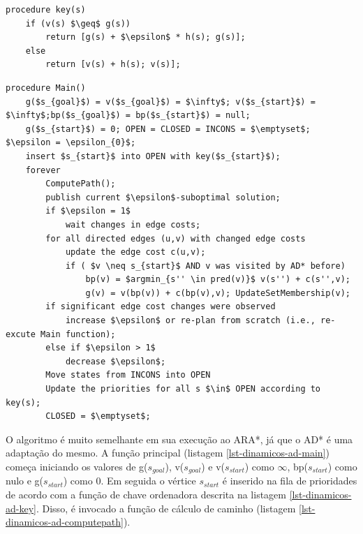 \begin{lstlisting}[mathescape, label=lst-dinamicos-ad-key, caption=Algoritmo AD* - função da chave ordenadora da fila de prioridades, float=htpb]
procedure key(s)
	if (v(s) $\geq$ g(s))
		return [g(s) + $\epsilon$ * h(s); g(s)];
	else
		return [v(s) + h(s); v(s)];
\end{lstlisting}

\begin{lstlisting}[mathescape, label=lst-dinamicos-ad-main, caption=Algoritmo AD* - função principal, float=htpb]
procedure Main()
	g($s_{goal}$) = v($s_{goal}$) = $\infty$; v($s_{start}$) = $\infty$;bp($s_{goal}$) = bp($s_{start}$) = null;
	g($s_{start}$) = 0; OPEN = CLOSED = INCONS = $\emptyset$; $\epsilon = \epsilon_{0}$;
	insert $s_{start}$ into OPEN with key($s_{start}$);
	forever
		ComputePath();
		publish current $\epsilon$-suboptimal solution;
		if $\epsilon = 1$
			wait changes in edge costs;
		for all directed edges (u,v) with changed edge costs
			update the edge cost c(u,v);
			if ( $v \neq s_{start}$ AND v was visited by AD* before)
				bp(v) = $argmin_{s'' \in pred(v)}$ v(s'') + c(s'',v);
				g(v) = v(bp(v)) + c(bp(v),v); UpdateSetMembership(v);
		if significant edge cost changes were observed
			increase $\epsilon$ or re-plan from scratch (i.e., re-excute Main function);
		else if $\epsilon > 1$
			decrease $\epsilon$;
		Move states from INCONS into OPEN
		Update the priorities for all s $\in$ OPEN according to key(s);
		CLOSED = $\emptyset$;
\end{lstlisting}

O algoritmo é muito semelhante em sua execução ao ARA*, já que o AD* é uma adaptação do mesmo. A função principal (listagem \ref{lst-dinamicos-ad-main}) começa iniciando os valores de g($s_{goal}$), v($s_{goal}$) e v($s_{start}$) como $\infty$, bp($s_{start}$) como nulo e g($s_{start}$) como 0. Em seguida o vértice $s_{start}$ é inserido na fila de prioridades de acordo com  a função de chave ordenadora descrita na listagem \ref{lst-dinamicos-ad-key}. Disso, é invocado a função de cálculo de caminho (listagem \ref{lst-dinamicos-ad-computepath}).

